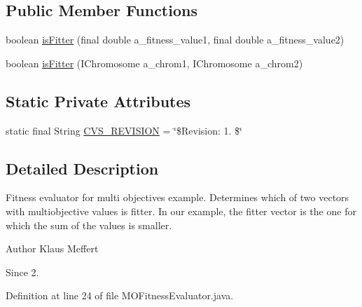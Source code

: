 \subsection*{Public Member Functions}
\begin{DoxyCompactItemize}
\item 
boolean \hyperlink{classexamples_1_1multiobjective_1_1_m_o_fitness_evaluator_a4d703b9541e8e19570957d1a1060ac64}{is\-Fitter} (final double a\-\_\-fitness\-\_\-value1, final double a\-\_\-fitness\-\_\-value2)
\item 
boolean \hyperlink{classexamples_1_1multiobjective_1_1_m_o_fitness_evaluator_ad5d1d5e68908a1ddd39f114793b8501f}{is\-Fitter} (I\-Chromosome a\-\_\-chrom1, I\-Chromosome a\-\_\-chrom2)
\end{DoxyCompactItemize}
\subsection*{Static Private Attributes}
\begin{DoxyCompactItemize}
\item 
static final String \hyperlink{classexamples_1_1multiobjective_1_1_m_o_fitness_evaluator_a15ff6345a1b26334593e54ad4b057934}{C\-V\-S\-\_\-\-R\-E\-V\-I\-S\-I\-O\-N} = \char`\"{}\$Revision\-: 1. \$\char`\"{}
\end{DoxyCompactItemize}


\subsection{Detailed Description}
Fitness evaluator for multi objectives example. Determines which of two vectors with multiobjective values is fitter. In our example, the fitter vector is the one for which the sum of the values is smaller.

\begin{DoxyAuthor}{Author}
Klaus Meffert 
\end{DoxyAuthor}
\begin{DoxySince}{Since}
2. 
\end{DoxySince}


Definition at line 24 of file M\-O\-Fitness\-Evaluator.\-java.



